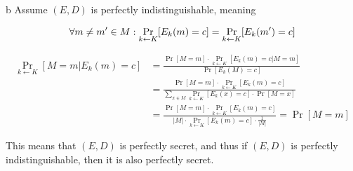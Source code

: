 \documentclass{article}
\begin{document}
\begin{paragraph}
	b Assume $(E,D)$ is perfectly indistinguishable, meaning

	\begin{equation*}
		\forall m\neq m' \in M: \Pr\limits_{k \leftarrow K}[E_k(m) = c] = \Pr\limits_{k \leftarrow K}[E_k(m') = c]\\
	\end{equation*}

	\begin{align*}
		\Pr\limits_{k \leftarrow K}[M = m | E_k(m) = c] & = \frac{\Pr[M = m] \cdot \Pr\limits_{k \leftarrow K}[E_k(m) = c | M = m]}{\Pr[E_k(M) = c]}                                                            \\
		                                                & = \frac{\Pr[M = m] \cdot \Pr\limits_{k \leftarrow K}[E_k(m) = c]}{\sum\limits_{x \in M} \Pr\limits_{k \leftarrow K}[E_k(x) = c] \cdot \Pr[M = x]}     \\
		                                                & = \frac{\Pr[M = m] \cdot \Pr\limits_{k \leftarrow K}[E_k(m) = c]}{|M| \cdot \Pr\limits_{k \leftarrow K}[E_k(m) = c] \cdot \frac{1}{|M|}} = \Pr[M = m]
	\end{align*}

	This means that $(E,D)$ is perfectly secret, and thus if $(E,D)$ is perfectly indistinguishable, then it is also perfectly secret.
\end{paragraph}
\end{document}
